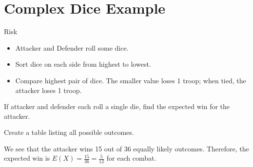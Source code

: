 \section[Dice]{Complex Dice Example}
\frame{\sectionpage}

\begin{frame}{Risk}
\begin{itemize}
\item Attacker and Defender roll some dice. 
\item Sort dice on each side from highest to lowest.
\item Compare highest pair of dice. The smaller value loses 1 troop; when tied, the attacker loses 1 troop.
\end{itemize}
\end{frame}


\begin{frame}
\end{frame}

\begin{frame}[t]
\begin{ex}
If attacker and defender each roll a single die, find the expected win for the attacker.
\end{ex}
\begin{sol}
Create a table listing all possible outcomes.
\begin{figure}[h!]
\centering
{}
\end{figure}
We see that the attacker wins 15 out of 36 equally likely outcomes. Therefore, the expected win is $E(X) = \tfrac{15}{36} = \tfrac{5}{12}$ for each combat.
\end{sol}
\end{frame}

